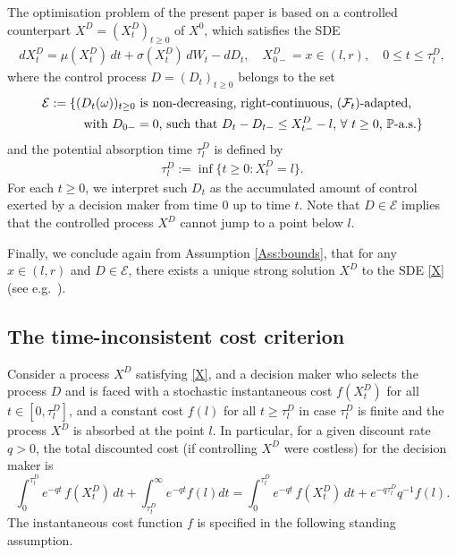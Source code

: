 \documentclass[11pt]{article} %
\numberwithin{komcounter}{section}
\begin{document}
The optimisation problem of the present paper is based on a controlled counterpart $X^D=\left(X_t^D\right)_{t\geq0}$ of $X^0$, which satisfies the SDE 
\begin{align} \label{X}
d X_t^D = \mu(X_t^D) \, dt + \sigma(X_t^D) \, dW_t - d D_t, \quad  X^D_{0-}= x \in (l,r), \quad 0 \leq t \leq \tau^D_l,
\end{align}
where the control process $D= (D_t)_{t\geq0}$ belongs to the set
\begin{align*}
\mathcal{E} := \{ &(D_t(\omega))_{t\geq0} \text{ is non-decreasing, right-continuous, $\left({\cal F}_t\right)$-adapted,}\\
&\; \text{ with $D_{0-}=0$, such that  $D_{t}-D_{t-} \leq X_{t-}^D-l$, $\forall$ $t \geq 0$,  $\mathbb{P}$-a.s.\}}
\end{align*}
and the potential absorption time $\tau^D_l$ is defined by 
\begin{align} \label{tau}
\tau^D_l := \inf\{t\geq 0: X^D_t =l\}.
\end{align}
For each $t\geq 0$, we interpret such $D_t$ as the accumulated amount of control exerted by a decision maker from time $0$ up to time $t$. 
Note that $D\in\mathcal{E}$ implies that the controlled process $X^D$ cannot jump to a point below $l$. 

Finally, we conclude again from Assumption \ref{Ass:bounds}, that for any $x\in(l,r)$ and $D \in \mathcal{E}$, there exists a unique strong solution $X^D$ to the SDE \eqref{X} (see e.g.~\cite[Theorem V.7]{protter2005stochastic}).



\subsection{The time-inconsistent cost criterion}
\label{sec:inconsistent}

Consider a process $X^{D}$ satisfying \eqref{X}, and a decision maker who selects the process $D$ and is faced with a stochastic instantaneous cost $f(X^D_t)$ for all $t \in [0, \tau^D_l]$, and a constant cost $f(l)$ for all $t \geq \tau^D_l$ in case $\tau^D_l$ is finite and the process $X^D$ is absorbed at the point $l$. 
In particular, for a given discount rate $q>0$, the total discounted cost (if controlling $X^D$ were costless) for the decision maker is 
$$
\int_0^{\tau^D_l} e^{-q t} \, f(X^D_t) \, dt + \int_{\tau^D_l}^\infty e^{-qt} f(l) dt 
= \int_0^{\tau^D_l} e^{-q t} \, f(X^D_t) \, dt + e^{-q \tau^D_l} q^{-1} f(l).
$$
The instantaneous cost function $f$ is specified in the following standing assumption.
\end{document}
